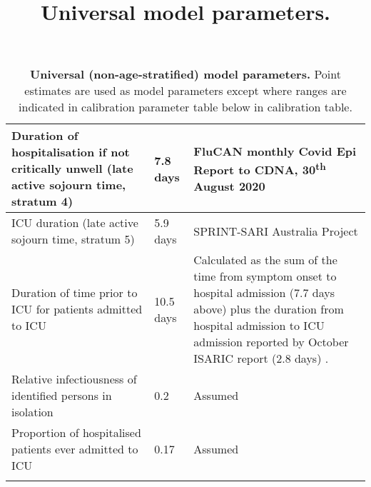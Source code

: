 \begin{longtable}[ht]{| >{\raggedright}p{4cm} | >{\raggedright}p{3cm} | p{6.8cm} |}
    \hline
    Duration of hospitalisation if not critically unwell (late active sojourn time, stratum 4) &
    7.8 days &
    FluCAN monthly Covid Epi Report to CDNA, 30\textsuperscript{th} August 2020 \\
    \hline
    ICU duration (late active sojourn time, stratum 5) & 5.9 days &
    SPRINT-SARI Australia Project \\
    \hline
    Duration of time prior to ICU for patients admitted to ICU & 
    10.5 days & 
    Calculated as the sum of the time from symptom onset to hospital admission (7.7 days above) plus the duration from hospital admission to ICU admission reported by October ISARIC report (2.8 days) \cite{RN22}. \\
    \hline
    Relative infectiousness of identified persons in isolation & 0.2 & Assumed \\
    \hline
    Proportion of hospitalised patients ever admitted to ICU & 0.17 & Assumed \\
    \hline
	\caption{\textbf{Universal (non-age-stratified) model parameters.} Point estimates are used as model parameters except where ranges are indicated in calibration parameter table below in calibration table.}
	\title{Universal model parameters.}
	\label{tab:params}
\end{longtable}

